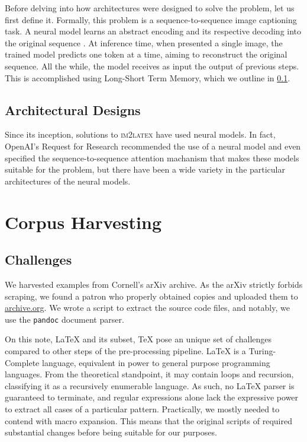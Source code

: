 \documentclass{article}
\begin{document}
Before delving into how architectures were designed to solve the problem, let us
first define it. Formally, this problem is a sequence-to-sequence image
captioning task. A neural model learns an abstract encoding and its respective
decoding into the original sequence \parencite[1]{deng2016you}. At inference
time, when presented a single image, the trained model predicts one token at a
time, aiming to reconstruct the original sequence. All the while, the model
receives as input the output of previous steps. This is accomplished using
Long-Short Term Memory, which we outline in \ref{netarch}.

\subsection{Architectural Designs}
\label{netarch}

Since its inception, solutions to \textsc{im2latex} have used neural models. In
fact, OpenAI's Request for Research recommended the use of a neural model and
even specified the sequence-to-sequence attention machanism that makes these
models suitable for the problem, but there have been a wide variety in the
particular architectures of the neural models.

\citeauthor{deng2016you}
\citeauthor{genthial2016image}
\citeauthor{wang2019translating}
\citeauthor{bender2019learning}

\section{Corpus Harvesting}


\subsection{Challenges}

We harvested examples from Cornell's arXiv archive. As the arXiv strictly
forbids scraping, we found a patron who properly obtained copies and uploaded
them to \url{archive.org}. We wrote a script to extract the source code files,
and notably, we use the \texttt{pandoc} document parser.

On this note, \LaTeX{} and its subset, \TeX{} pose an unique set of challenges
compared to other steps of the pre-processing pipeline. \LaTeX{} is a
Turing-Complete language, equivalent in power to general purpose programming
languages. From the theoretical standpoint, it may contain loops and recursion,
classifying it as a recursively enumerable language. As such, no \LaTeX{} parser
is guaranteed to terminate, and regular expressions alone lack the expressive
power to extract all cases of a particular pattern. Practically, we mostly
needed to contend with macro expansion. This means that the original scripts of
\cite{deng2016you} required substantial changes before being suitable for our
purposes.
\end{document}
